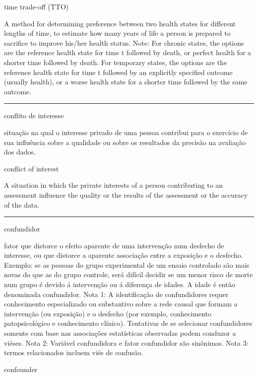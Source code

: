\documentclass[
  openany]{book}
\begin{document}
time trade-off (TTO)

A method for determining preference between two health states for different lengths of time, to estimate how many years of life a person is prepared to sacrifice to improve his/her health status. Note: For chronic states, the options are the reference health state for time t followed by death, or perfect health for a shorter time followed by death. For temporary states, the options are the reference health state for time t followed by an explicitly specified outcome (usually health), or a worse health state for a shorter time followed by the same outcome.

\begin{center}\rule{0.5\linewidth}{0.5pt}\end{center}

conflito de interesse

situação na qual o interesse privado de uma pessoa contribui para o exercício de sua influência sobre a qualidade ou sobre os resultados da precisão na avaliação dos dados.

conflict of interest

A situation in which the private interests of a person contributing to an assessment influence the quality or the results of the assessment or the accuracy of the data.

\begin{center}\rule{0.5\linewidth}{0.5pt}\end{center}

confundidor

fator que distorce o efeito aparente de uma intervenção num desfecho de interesse, ou que distorce a aparente associação entre a exposição e o desfecho. Exemplo: se as pessoas do grupo experimental de um ensaio controlado são mais novas do que as do grupo controle, será difícil decidir se um menor risco de morte num grupo é devido á intervenção ou á diferença de idades. A idade é então denominada confundidor. Nota 1: A identificação de confundidores requer conhecimento especializado ou substantivo sobre a rede causal que formam a intervenção (ou exposição) e o desfecho (por exemplo, conhecimento patopsicológico e conhecimento clínico). Tentativas de se selecionar confundidores somente com base nas associações estatísticas observadas podem conduzor a viéses. Nota 2: Variável confundidora e fator confundidor são sinônimos. Nota 3: termos relacionados incluem viés de confusão.

confounder
\end{document}
